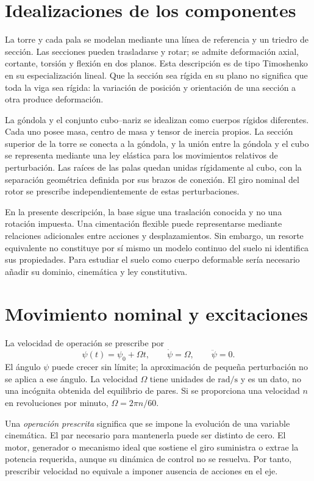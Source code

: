 \documentclass[11pt,a4paper,oneside]{report}
\begin{document}
\section{Idealizaciones de los componentes}
La torre y cada pala se modelan mediante una línea de referencia y un triedro de sección. Las secciones pueden trasladarse y rotar; se admite deformación axial, cortante, torsión y flexión en dos planos. Esta descripción es de tipo Timoshenko en su especialización lineal. Que la sección sea rígida en su plano no significa que toda la viga sea rígida: la variación de posición y orientación de una sección a otra produce deformación.

La góndola y el conjunto cubo--nariz se idealizan como cuerpos rígidos diferentes. Cada uno posee masa, centro de masa y tensor de inercia propios. La sección superior de la torre se conecta a la góndola, y la unión entre la góndola y el cubo se representa mediante una ley elástica para los movimientos relativos de perturbación. Las raíces de las palas quedan unidas rígidamente al cubo, con la separación geométrica definida por sus brazos de conexión. El giro nominal del rotor se prescribe independientemente de estas perturbaciones.

En la presente descripción, la base sigue una traslación conocida y no una rotación impuesta. Una cimentación flexible puede representarse mediante relaciones adicionales entre acciones y desplazamientos. Sin embargo, un resorte equivalente no constituye por sí mismo un modelo continuo del suelo ni identifica sus propiedades. Para estudiar el suelo como cuerpo deformable sería necesario añadir su dominio, cinemática y ley constitutiva.

\section{Movimiento nominal y excitaciones}
La velocidad de operación se prescribe por
\begin{equation}
 \psi(t)=\psi_0+\Omega t,\qquad \dot\psi=\Omega,\qquad \ddot\psi=0.
 \label{eq:psi}
\end{equation}
El ángulo $\psi$ puede crecer sin límite; la aproximación de pequeña perturbación no se aplica a ese ángulo. La velocidad $\Omega$ tiene unidades de $\mathrm{rad/s}$ y es un dato, no una incógnita obtenida del equilibrio de pares. Si se proporciona una velocidad $n$ en revoluciones por minuto, $\Omega=2\pi n/60$.

Una \emph{operación prescrita} significa que se impone la evolución de una variable cinemática. El par necesario para mantenerla puede ser distinto de cero. El motor, generador o mecanismo ideal que sostiene el giro suministra o extrae la potencia requerida, aunque su dinámica de control no se resuelva. Por tanto, prescribir velocidad no equivale a imponer ausencia de acciones en el eje.
\end{document}
